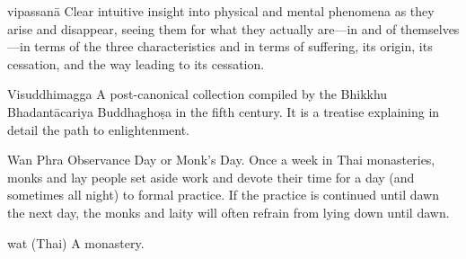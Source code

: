 vipassanā Clear intuitive insight into physical and mental phenomena 
as they arise and disappear, seeing them for what they actually 
are---in and of themselves---in terms of the three characteristics and 
in terms of suffering, its origin, its cessation, and the way leading 
to its cessation.

Visuddhimagga A post-canonical collection compiled by the Bhikkhu 
Bhadantācariya Buddhaghoṣa in the fifth century. It is a treatise 
explaining in detail the path to enlightenment.

Wan Phra Observance Day or Monk's Day. Once a week in Thai monasteries, 
monks and lay people set aside work and devote their time for a day 
(and sometimes all night) to formal practice. If the practice is 
continued until dawn the next day, the monks and laity will often 
refrain from lying down until dawn.

wat (Thai) A monastery.

